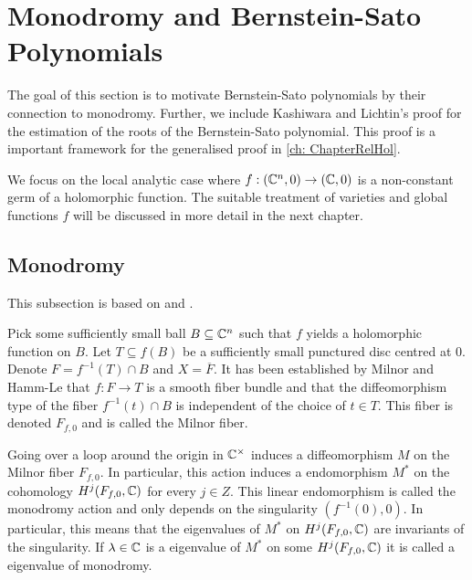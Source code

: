 \section{Monodromy and Bernstein-Sato Polynomials}
The goal of this section is to motivate Bernstein-Sato polynomials by their connection to monodromy.
Further, we include Kashiwara and Lichtin's proof for the estimation of the roots of the Bernstein-Sato polynomial.
This proof is a important framework for the generalised proof in \cref{ch: ChapterRelHol}.


We focus on the local analytic case where $f:(\mathbb{C}^{n},0)\to (\mathbb{C},0)$ is a non-constant germ of a holomorphic function.
The suitable treatment of varieties and global functions $f$ will be discussed in more detail in the next chapter.
\subsection{Monodromy}
This subsection is based on \cite[Chapter 1]{blanco2020bernstein} and \cite{budur2015bernstein}.

Pick some sufficiently small ball $B\subseteq \mathbb{C}^{n}$ such that $f$ yields a holomorphic function on $B$.
Let $T\subseteq f(B)$ be a sufficiently small punctured disc centred at $0$.
Denote $F = f^{-1}(T)\cap B$ and $X = \overline{F}$.
It has been established by Milnor and Hamm-Le that $f:F \to T$ is a smooth fiber bundle and that the diffeomorphism type of the fiber $f^{-1}(t) \cap B $ is independent of the choice of $t\in T$.
This fiber is denoted $F_{f,0}$ and is called the Milnor fiber.

Going over a loop around the origin in $\mathbb{C}^\times$ induces a diffeomorphism $M$ on the Milnor fiber $F_{f,0}$.
In particular, this action induces a endomorphism $M^*$ on the cohomology $H^j(F_{f,0},\mathbb{C})$ for every $j\in Z$.
This linear endomorphism is called the monodromy action and only depends on the singularity $(f^{-1}(0),0)$.
In particular, this means that the eigenvalues of $M^*$ on $H^j(F_{f,0},\mathbb{C})$ are invariants of the singularity.
If $\lambda \in \mathbb{C}$ is a eigenvalue of $M^*$ on some $H^j(F_{f,0},\mathbb{C})$ it is called a eigenvalue of monodromy.

